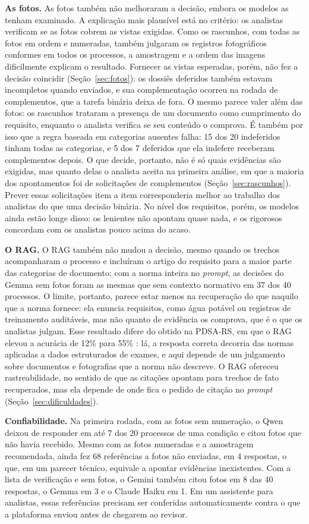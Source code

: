 \textbf{As fotos.} As fotos também não melhoraram a decisão, embora os modelos as tenham examinado. A explicação mais plausível está no critério: os analistas verificam se as fotos cobrem as vistas exigidas. Como os rascunhos, com todas as fotos em ordem e numeradas, também julgaram os registros fotográficos conformes em todos os processos, a amostragem e a ordem das imagens dificilmente explicam o resultado. Fornecer as vistas esperadas, porém, não fez a decisão coincidir (Seção~\ref{sec:fotos}): os dossiês deferidos também estavam incompletos quando enviados, e sua complementação ocorreu na rodada de complementos, que a tarefa binária deixa de fora. O mesmo parece valer além das fotos: os rascunhos trataram a presença de um documento como cumprimento do requisito, enquanto o analista verifica se seu conteúdo o comprova. É também por isso que a regra baseada em categorias ausentes falha: 15 dos 20 indeferidos tinham todas as categorias, e 5 dos 7 deferidos que ela indefere receberam complementos depois. O que decide, portanto, não é só quais evidências são exigidas, mas quanto delas o analista aceita na primeira análise, em que a maioria dos apontamentos foi de solicitações de complementos (Seção~\ref{sec:rascunhos}). Prever essas solicitações item a item corresponderia melhor ao trabalho dos analistas do que uma decisão binária. No nível dos requisitos, porém, os modelos ainda estão longe disso: os lenientes não apontam quase nada, e os rigorosos concordam com os analistas pouco acima do acaso.

\textbf{O RAG.} O RAG também não mudou a decisão, mesmo quando os trechos acompanharam o processo e incluíram o artigo do requisito para a maior parte das categorias de documento; com a norma inteira no \textit{prompt}, as decisões do Gemma sem fotos foram as mesmas que sem contexto normativo em 37 dos 40 processos. O limite, portanto, parece estar menos na recuperação do que naquilo que a norma fornece: ela enuncia requisitos, como água potável ou registros de treinamento auditáveis, mas não quanto de evidência os comprova, que é o que os analistas julgam. Esse resultado difere do obtido na PDSA-RS, em que o RAG elevou a acurácia de 12\% para 55\% \cite{Montero2025}: lá, a resposta correta decorria das normas aplicadas a dados estruturados de exames, e aqui depende de um julgamento sobre documentos e fotografias que a norma não descreve. O RAG ofereceu rastreabilidade, no sentido de que as citações apontam para trechos de fato recuperados, mas ela depende de onde fica o pedido de citação no \textit{prompt} (Seção~\ref{sec:dificuldades}).

\textbf{Confiabilidade.} Na primeira rodada, com as fotos sem numeração, o Qwen deixou de responder em até 7 dos 20 processos de uma condição e citou fotos que não havia recebido. Mesmo com as fotos numeradas e a amostragem recomendada, ainda fez 68 referências a fotos não enviadas, em 4 respostas, o que, em um parecer técnico, equivale a apontar evidências inexistentes. Com a lista de verificação e sem fotos, o Gemini também citou fotos em 8 das 40 respostas, o Gemma em 3 e o Claude Haiku em 1. Em um assistente para analistas, essas referências precisam ser conferidas automaticamente contra o que a plataforma enviou antes de chegarem ao revisor.
